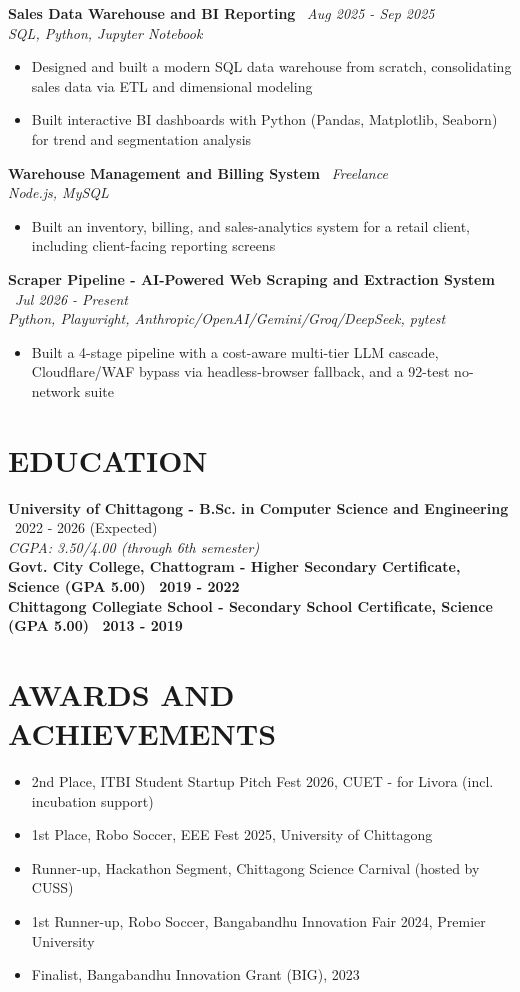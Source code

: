 \documentclass[10.5pt,a4paper]{article}
\newenvironment{tightitemize}{
  \begin{itemize}[leftmargin=15pt, itemsep=1pt, parsep=0pt, topsep=2pt]
}{
  \end{itemize}
}
\newcommand{\entry}[3]{%
  \textbf{#1} \textbar\ #2\\
  \textit{#3}%
}
\newcommand{\entrysimple}[2]{%
  \textbf{#1} \textbar\ \textit{#2}\\[1pt]
}
\newcommand{\entrybold}[2]{%
  \textbf{#1 \textbar\ #2}%
}
\begin{document}
\entrysimple{Sales Data Warehouse and BI Reporting}{Aug 2025 - Sep 2025}
\textit{SQL, Python, Jupyter Notebook}
\begin{tightitemize}
  \item Designed and built a modern SQL data warehouse from scratch, consolidating sales data via ETL and dimensional modeling
  \item Built interactive BI dashboards with Python (Pandas, Matplotlib, Seaborn) for trend and segmentation analysis
\end{tightitemize}

\entrysimple{Warehouse Management and Billing System}{Freelance}
\textit{Node.js, MySQL}
\begin{tightitemize}
  \item Built an inventory, billing, and sales-analytics system for a retail client, including client-facing reporting screens
\end{tightitemize}

\entrysimple{Scraper Pipeline - AI-Powered Web Scraping and Extraction System}{Jul 2026 - Present}
\textit{Python, Playwright, Anthropic/OpenAI/Gemini/Groq/DeepSeek, pytest}
\begin{tightitemize}
  \item Built a 4-stage pipeline with a cost-aware multi-tier LLM cascade, Cloudflare/WAF bypass via headless-browser fallback, and a 92-test no-network suite
\end{tightitemize}

\section*{EDUCATION}
\entry{University of Chittagong - B.Sc. in Computer Science and Engineering}{2022 - 2026 (Expected)}{CGPA: 3.50/4.00 (through 6th semester)}\\[4pt]
\entrybold{Govt. City College, Chattogram - Higher Secondary Certificate, Science (GPA 5.00)}{2019 - 2022}\\[2pt]
\entrybold{Chittagong Collegiate School - Secondary School Certificate, Science (GPA 5.00)}{2013 - 2019}

\section*{AWARDS AND ACHIEVEMENTS}
\begin{tightitemize}
  \item 2nd Place, ITBI Student Startup Pitch Fest 2026, CUET - for Livora (incl. incubation support)
  \item 1st Place, Robo Soccer, EEE Fest 2025, University of Chittagong
  \item Runner-up, Hackathon Segment, Chittagong Science Carnival (hosted by CUSS)
  \item 1st Runner-up, Robo Soccer, Bangabandhu Innovation Fair 2024, Premier University
  \item Finalist, Bangabandhu Innovation Grant (BIG), 2023
\end{tightitemize}
\end{document}
